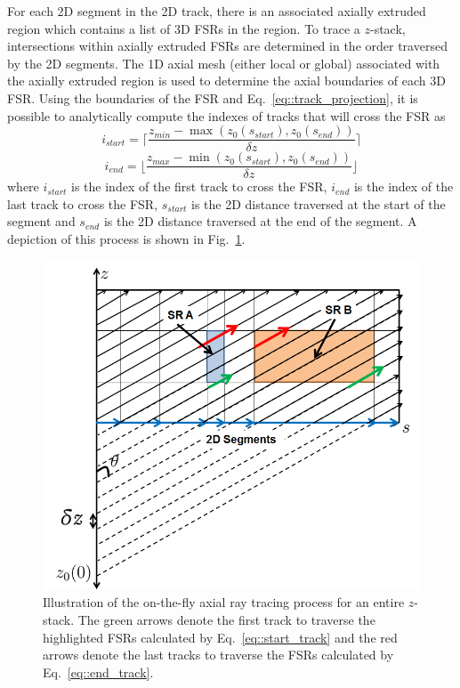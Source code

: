 For each 2D segment in the 2D track, there is an associated axially extruded region which contains a list of 3D FSRs in the region. To trace a $z$-stack, intersections within axially extruded FSRs are determined in the order traversed by the 2D segments. The 1D axial mesh (either local or global) associated with the axially extruded region is used to determine the axial boundaries of each 3D FSR. Using the boundaries of the FSR and Eq.~\ref{eq::track_projection}, it is possible to analytically compute the indexes of tracks that will cross the FSR as
\begin{equation}
i_{\textit{start}} = \Bigg\lceil\frac{z_{\textit{min}} - \max\left({z_0(s_{\textit{start}}), z_0(s_{\textit{end}})}\right) }{\delta z}\Bigg\rceil
\label{eq::start_track}
\end{equation}
\begin{equation}
i_{\textit{end}} = \Bigg\lfloor\frac{z_{\textit{max}} - \min\left({z_0(s_{\textit{start}}), z_0(s_{\textit{end}})}\right) }{\delta z}\Bigg\rfloor
\label{eq::end_track}
\end{equation}
where $i_{\textit{start}}$ is the index of the first track to cross the FSR, $i_{\textit{end}}$ is the index of the last track to cross the FSR, $s_{\textit{start}}$ is the 2D distance traversed at the start of the segment and $s_{\textit{end}}$ is the 2D distance traversed at the end of the segment. A depiction of this process is shown in Fig.~\ref{fig::stack_tracing}.

\begin{figure}[ht!]
	\centering
	\includegraphics[width=0.75\linewidth]{figures/ph2016/stack_tracing.png}
	\caption{Illustration of the on-the-fly axial ray tracing process for an entire $z$-stack. The green arrows denote the first track to traverse the highlighted FSRs calculated by Eq.~\ref{eq::start_track} and the red arrows denote the last tracks to traverse the FSRs calculated by Eq.~\ref{eq::end_track}.}
	\label{fig::stack_tracing}
\end{figure}


